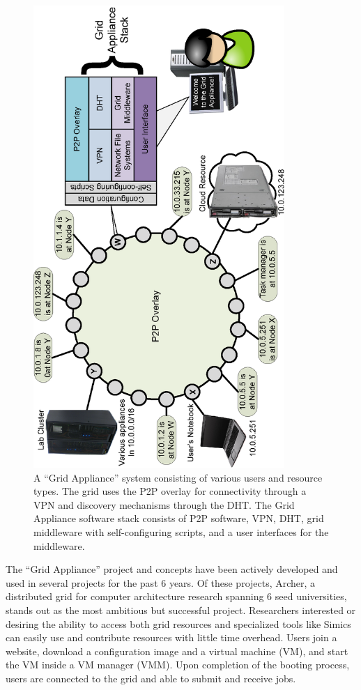 \documentclass[conference]{IEEEtran}
\begin{document}
\begin{figure}[ht]
\centering
\includegraphics[width=3.75in,angle=-90]{figs/appliance_overlays.eps}
\caption{A ``Grid Appliance'' system consisting of various users and resource
types.  The grid uses the P2P overlay for connectivity through a VPN and
discovery mechanisms through the DHT.  The Grid Appliance software stack
consists of P2P software, VPN, DHT, grid middleware with self-configuring
scripts, and a user interfaces for the middleware.}
\label{fig:appliance}
\end{figure}

The ``Grid Appliance'' project and concepts have been actively developed and
used in several projects for the past 6 years.  Of these projects, Archer, a
distributed grid for computer architecture research spanning 6 seed
universities, stands out as the most ambitious but successful project.
Researchers interested or desiring the ability to access both grid resources
and specialized tools like Simics can easily use and contribute resources with
little time overhead.  Users join a website, download a configuration image and
a virtual machine (VM), and start the VM inside a VM manager (VMM).  Upon
completion of the booting process, users are connected to the grid and able to
submit and receive jobs.
\end{document}
